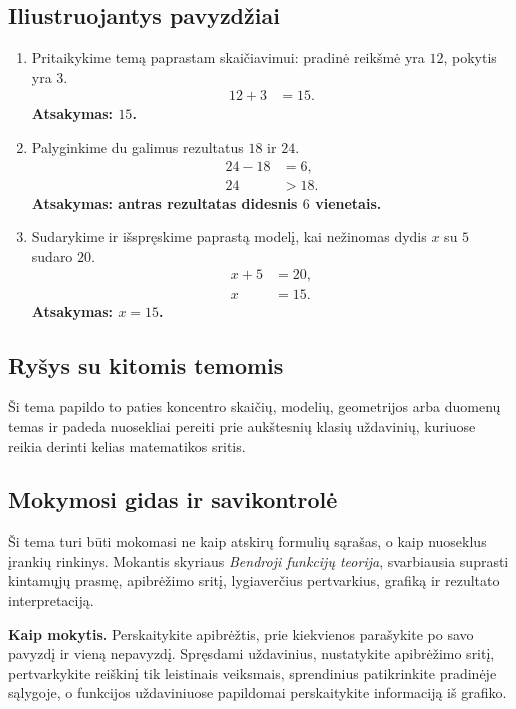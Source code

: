 \subsection{Iliustruojantys pavyzdžiai}
\begin{enumerate}[label=\arabic*.]
\item Pritaikykime temą paprastam skaičiavimui: pradinė reikšmė yra \(12\), pokytis yra \(3\).
\begin{align}
12+3&=15.
\end{align}
\textbf{Atsakymas: \(15\).}
\item Palyginkime du galimus rezultatus \(18\) ir \(24\).
\begin{align}
24-18&=6,\\
24&>18.
\end{align}
\textbf{Atsakymas: antras rezultatas didesnis \(6\) vienetais.}
\item Sudarykime ir išspręskime paprastą modelį, kai nežinomas dydis \(x\) su \(5\) sudaro \(20\).
\begin{align}
x+5&=20,\\
x&=15.
\end{align}
\textbf{Atsakymas: \(x=15\).}
\end{enumerate}

\subsection{Ryšys su kitomis temomis}
Ši tema papildo to paties koncentro skaičių, modelių, geometrijos arba duomenų temas ir padeda nuosekliai pereiti prie aukštesnių klasių uždavinių, kuriuose reikia derinti kelias matematikos sritis.

\subsection{Mokymosi gidas ir savikontrolė}

Ši tema turi būti mokomasi ne kaip atskirų formulių sąrašas, o kaip nuoseklus įrankių rinkinys. Mokantis skyriaus \textit{Bendroji funkcijų teorija}, svarbiausia suprasti kintamųjų prasmę, apibrėžimo sritį, lygiaverčius pertvarkius, grafiką ir rezultato interpretaciją.

\textbf{Kaip mokytis.} Perskaitykite apibrėžtis, prie kiekvienos parašykite po savo pavyzdį ir vieną nepavyzdį. Spręsdami uždavinius, nustatykite apibrėžimo sritį, pertvarkykite reiškinį tik leistinais veiksmais, sprendinius patikrinkite pradinėje sąlygoje, o funkcijos uždaviniuose papildomai perskaitykite informaciją iš grafiko.

